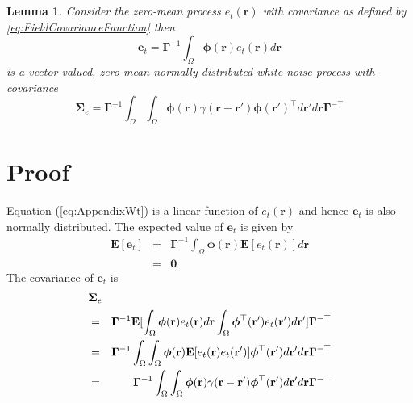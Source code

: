 \documentclass[twocolumn,11pt,a4paper]{article}		%
\begin{document}
\section{}\label{ColoredNoise} 
\newtheorem{lemma}{Lemma} 
\begin{lemma}
	Consider the zero-mean process $e_t\left(\mathbf r\right)$ with covariance as defined by \ref{eq:FieldCovarianceFunction} then 
	\begin{equation}
		\mathbf e_t=\boldsymbol{\Gamma}^{-1}\int_\Omega {\boldsymbol{\phi} ( \mathbf{r} )e_t( \mathbf{r} )d\mathbf{r}} \label{eq:AppendixWt} 
	\end{equation}
	is a vector valued, zero mean normally distributed white noise process with covariance 
	\begin{equation}
		\boldsymbol\Sigma_e =\mathbf{\Gamma}^{-1}\int_{\Omega}\int_{\Omega}\boldsymbol{\phi}\left(\mathbf r\right) \gamma\left(\mathbf r- \mathbf r' \right)\boldsymbol{\phi}\left(\mathbf r'\right)^{\top}d\mathbf r' d\mathbf r\mathbf{\Gamma}^{- \top} 
	\end{equation}
	\label{lemma:FieldCovariance} 
\end{lemma}
\section*{Proof} Equation (\ref{eq:AppendixWt}) is a linear function of $e_t(\mathbf r)$ and hence $\mathbf{e}_t$ is also normally distributed. The expected value of $\mathbf e_t$ is given by 
\begin{eqnarray}
	\mathbf E\left[ \mathbf e_t\right]&=& \mathbf{\Gamma}^{-1}\int_{\Omega}\boldsymbol\phi\left(\mathbf{r}\right)\mathbf E\left[e_t\left(\mathbf{r}\right)\right] d\mathbf{r} \nonumber \\
	&=&\mathbf 0 
\end{eqnarray}
The covariance of $\mathbf{e}_t$ is 
\begin{eqnarray}
	\lefteqn{\mathbf{\Sigma}_e} \nonumber \\ 
&=&\mathbf{\Gamma}^{-1}\mathbf E[\int_{\Omega}\boldsymbol{\phi}(\mathbf{r})e_t(\mathbf{r})d\mathbf{r} \int_{\Omega}\boldsymbol{\phi}^{\top}(\mathbf{r}') e_t(\mathbf{r}')d\mathbf{r}']\mathbf{\Gamma}^{- \top} \nonumber \\
	&=&\mathbf{\Gamma}^{-1}\int_{\Omega}\int_{\Omega} \boldsymbol{\phi}(\mathbf{r}) \mathbf E[e_t(\mathbf{r})e_t(\mathbf{r}')]\boldsymbol{\phi}^{\top}(\mathbf{r}')d\mathbf{r}' d\mathbf r\mathbf{\Gamma}^{- \top} \nonumber\\
	&=&\mathbf{\Gamma}^{-1}\int_{\Omega}\int_{\Omega}\boldsymbol{\phi}(\mathbf r) \gamma(\mathbf r- \mathbf r' )\boldsymbol{\phi}^{\top}(\mathbf r')d\mathbf r' d\mathbf r\mathbf{\Gamma}^{-\top} 
\end{eqnarray}
\end{document}

